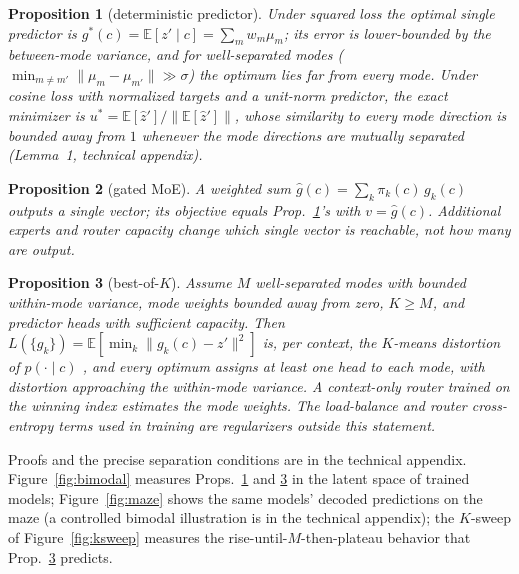 \documentclass[letterpaper]{article}
\newtheorem{prop}{Proposition}
\begin{document}
\begin{prop}[deterministic predictor]\label{prop:mean}
Under squared loss the optimal single predictor is $g^*(c)=\mathbb{E}[z'\mid c]=\sum_m w_m\mu_m$; its error
is lower-bounded by the between-mode variance, and for well-separated modes
($\min_{m\neq m'}\lVert\mu_m-\mu_{m'}\rVert\gg\sigma$) the optimum lies far from every mode. Under cosine
loss with normalized targets and a unit-norm predictor, the exact minimizer is
$u^*=\mathbb{E}[\hat z']/\lVert\mathbb{E}[\hat z']\rVert$, whose similarity to every mode direction is
bounded away from $1$ whenever the mode directions are mutually separated (Lemma~1, technical appendix).
\end{prop}

\begin{prop}[gated MoE]\label{prop:moe}
A weighted sum $\hat g(c)=\sum_k \pi_k(c)\,g_k(c)$ outputs a single vector; its objective equals
Prop.~\ref{prop:mean}'s with $v=\hat g(c)$. Additional experts and router capacity change which single
vector is reachable, not how many are output.
\end{prop}

\begin{prop}[best-of-$K$]\label{prop:lloyd}
Assume $M$ well-separated modes with bounded within-mode variance, mode weights bounded away from zero,
$K\geq M$, and predictor heads with sufficient capacity. Then
$L(\{g_k\})=\mathbb{E}\!\left[\min_k\lVert g_k(c)-z'\rVert^2\right]$ is, per context, the $K$-means
distortion of $p(\cdot\mid c)$ \citep{lloyd1982least}, and every optimum assigns at least one head to each
mode, with distortion approaching the within-mode variance. A context-only router trained on the winning
index estimates the mode weights. The load-balance and router cross-entropy terms used in training are
regularizers outside this statement.
\end{prop}

Proofs and the precise separation conditions are in the technical appendix. Figure~\ref{fig:bimodal} measures Props.~\ref{prop:mean} and \ref{prop:lloyd} in the latent
space of trained models; Figure~\ref{fig:maze} shows the same models' decoded predictions on the maze
(a controlled bimodal illustration is in the technical appendix); the $K$-sweep of
Figure~\ref{fig:ksweep} measures the rise-until-$M$-then-plateau behavior that Prop.~\ref{prop:lloyd}
predicts.
\end{document}
